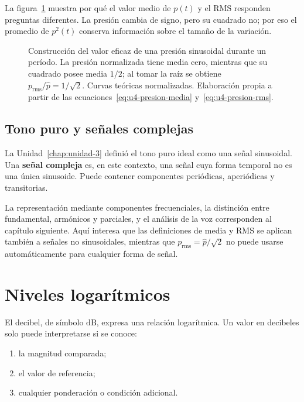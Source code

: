 La figura~\ref{fig:u4-rms-sinusoide} muestra por qué el valor medio de
\(p(t)\) y el RMS responden preguntas diferentes. La presión cambia de signo,
pero su cuadrado no; por eso el promedio de \(p^2(t)\) conserva información
sobre el tamaño de la variación.

\begin{figure}[!htbp]
    \centering
    
    \caption{Construcción del valor eficaz de una presión sinusoidal durante
    un período. La presión normalizada tiene media cero, mientras que su
    cuadrado posee media \(1/2\); al tomar la raíz se obtiene
    \(p_\mathrm{rms}/\hat p=1/\sqrt{2}\). Curvas teóricas normalizadas.
    Elaboración propia a partir de las
    ecuaciones~\eqref{eq:u4-presion-media}
    y~\eqref{eq:u4-presion-rms}.}
    \label{fig:u4-rms-sinusoide}
\end{figure}

\subsection{Tono puro y señales complejas}
\label{sec:u4-tono-complejo}

La Unidad~\ref{chap:unidad-3} definió el tono puro ideal como una señal
sinusoidal. Una \textbf{señal compleja} es, en este contexto, una señal cuya
forma temporal no es una única sinusoide. Puede contener componentes
periódicas, aperiódicas y transitorias.

La representación mediante componentes frecuenciales, la distinción entre
fundamental, armónicos y parciales, y el análisis de la voz corresponden al
capítulo siguiente. Aquí interesa que las definiciones de media y RMS se
aplican también a señales no sinusoidales, mientras que
\(p_\mathrm{rms}=\hat p/\sqrt{2}\) no puede usarse automáticamente para
cualquier forma de señal.

\section{Niveles logarítmicos}
\label{sec:u4-niveles}

El decibel, de símbolo \(\text{dB}\), expresa una relación logarítmica. Un
valor en decibeles solo puede interpretarse si se conoce:

\begin{enumerate}
    \item la magnitud comparada;
    \item el valor de referencia;
    \item cualquier ponderación o condición adicional.
\end{enumerate}


